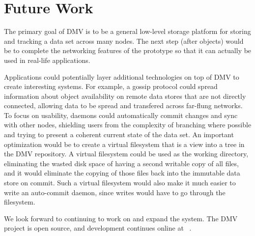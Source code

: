 \chapter{Future Work}

The primary goal of \gls{DMV} is to be a general low-level storage platform for
storing and tracking a data set across many nodes. The next step (after
 objects) would be to complete the networking
features of the prototype so that it can actually be used in real-life
applications.

Applications could potentially layer additional technologies on top of \gls{DMV}
to create interesting systems. For example, a gossip protocol could spread
information about object availability on remote data stores that are not
directly connected, allowing data to be spread and transfered across far-flung
networks. To focus on usability, daemons could automatically \gls{commit}
changes and sync with other nodes, shielding users from the complexity of
branching where possible and trying to present a coherent current state of the
data set. An important optimization would be to create a virtual filesystem that
is a view into a \gls{tree} in the \gls{DMV} repository. A virtual filesystem
could be used as the working directory, eliminating the wasted disk space of
having a second writable copy of all files, and it would eliminate the copying
of those files back into the immutable data store on \gls{commit}. Such a
virtual filesystem would also make it much easier to write an auto-\gls{commit}
daemon, since writes would have to go through the filesystem.

We look forward to continuing to work on and expand the system. The \gls{DMV}
project is open source, and development continues online at \dmvurl~.
